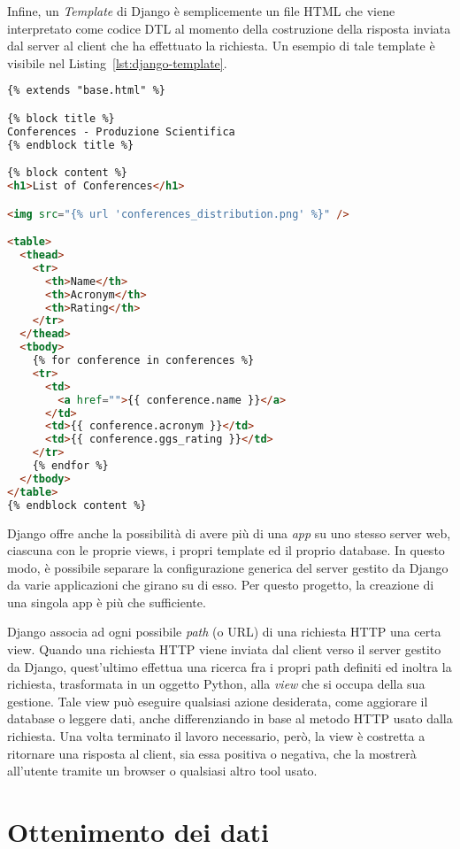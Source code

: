 Infine, un \textit{Template} di Django è semplicemente un file HTML che
viene interpretato come codice DTL al momento della costruzione della risposta
inviata dal server al client che ha effettuato la richiesta. Un esempio di tale
template è visibile nel Listing~\ref{lst:django-template}.

\begin{lstlisting}[language=HTML, caption=Template per l'elenco delle conferenze,label=lst:django-template]
{% extends "base.html" %}

{% block title %}
Conferences - Produzione Scientifica
{% endblock title %}

{% block content %}
<h1>List of Conferences</h1>

<img src="{% url 'conferences_distribution.png' %}" />

<table>
  <thead>
    <tr>
      <th>Name</th>
      <th>Acronym</th>
      <th>Rating</th>
    </tr>
  </thead>
  <tbody>
    {% for conference in conferences %}
    <tr>
      <td>
        <a href="">{{ conference.name }}</a>
      </td>
      <td>{{ conference.acronym }}</td>
      <td>{{ conference.ggs_rating }}</td>
    </tr>
    {% endfor %}
  </tbody>
</table>
{% endblock content %}
\end{lstlisting}

Django offre anche la possibilità di avere più di una \textit{app} su uno stesso
server web, ciascuna con le proprie views, i propri template ed il proprio
database. In questo modo, è possibile separare la configurazione generica del
server gestito da Django da varie applicazioni che girano su di esso.
Per questo progetto, la creazione di una singola app è più che sufficiente.

Django associa ad ogni possibile \textit{path} (o URL) di una richiesta HTTP
una certa view. Quando una richiesta HTTP viene inviata dal client verso il
server gestito da Django, quest'ultimo effettua una ricerca fra i propri path
definiti ed inoltra la richiesta, trasformata in un oggetto Python, alla
\textit{view} che si occupa della sua gestione.
Tale view può eseguire qualsiasi azione desiderata, come aggiorare il database o
leggere dati, anche differenziando in base al metodo HTTP usato dalla richiesta.
Una volta terminato il lavoro necessario, però, la view è costretta a ritornare
una risposta al client, sia essa positiva o negativa, che la mostrerà all'utente
tramite un browser o qualsiasi altro tool usato.

\section{Ottenimento dei dati}

